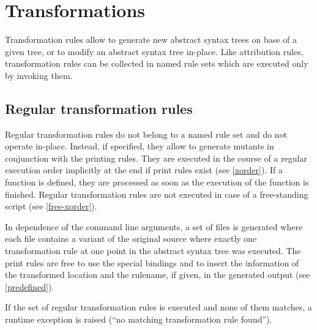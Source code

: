 \chapter{Transformations}\label{trans}

Transformation rules allow to generate new abstract syntax trees
on base of a given tree, or to modify an abstract syntax tree in-place.
Like attribution rules, transformation rules can be collected in named
rule sets which are executed only by invoking them.

\section{Regular transformation rules}\label{regtrans}

Regular transformation rules do not belong to a named rule set and do
not operate in-place. Instead, if specified, they allow to generate
mutants in conjunction with the printing rules. They are executed in the
course of a regular execution order implicitly at the end if print rules
exist (see \ref{xorder}). If a  function is
defined, they are processed as soon as the execution of the 
function is finished. Regular transformation rules are not executed
in case of a free-standing script (see \ref{free-xorder}).

In dependence of the command line arguments, a set of files is generated
where each file contains a variant of the original source where exactly
one transformation rule at one point in the abstract syntax tree
was executed. The print rules are free to use the special bindings
 and 
to insert the information of the transformed location and the rulename,
if given, in the generated output (see \ref{predefined}).

If the set of regular transformation rules is executed and none of
them matches, a runtime exception is raised (``no matching transformation
rule found'').


